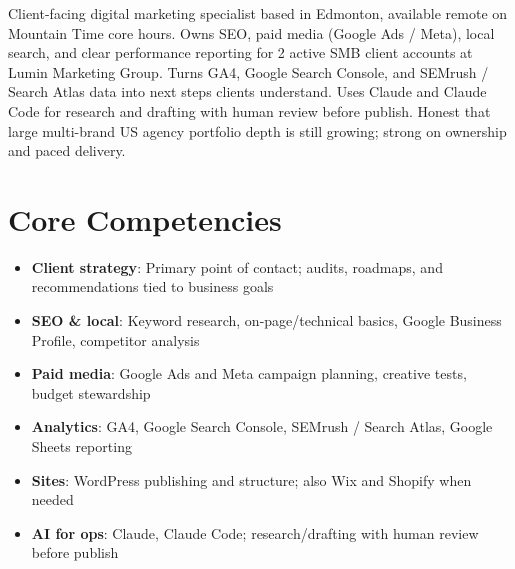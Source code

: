 \documentclass[11pt,a4paper,sans]{moderncv}
\begin{document}
\makecvtitle

\vspace{6pt}
\small{Client-facing digital marketing specialist based in Edmonton, available remote on Mountain Time core hours. Owns SEO, paid media (Google Ads / Meta), local search, and clear performance reporting for 2 active SMB client accounts at Lumin Marketing Group. Turns GA4, Google Search Console, and SEMrush / Search Atlas data into next steps clients understand. Uses Claude and Claude Code for research and drafting with human review before publish. Honest that large multi-brand US agency portfolio depth is still growing; strong on ownership and paced delivery.}

\section{Core Competencies}
\vspace{1pt}
\begin{itemize}
\item \textbf{Client strategy}: Primary point of contact; audits, roadmaps, and recommendations tied to business goals
\item \textbf{SEO \& local}: Keyword research, on-page/technical basics, Google Business Profile, competitor analysis
\item \textbf{Paid media}: Google Ads and Meta campaign planning, creative tests, budget stewardship
\item \textbf{Analytics}: GA4, Google Search Console, SEMrush / Search Atlas, Google Sheets reporting
\item \textbf{Sites}: WordPress publishing and structure; also Wix and Shopify when needed
\item \textbf{AI for ops}: Claude, Claude Code; research/drafting with human review before publish
\end{itemize}
\end{document}
